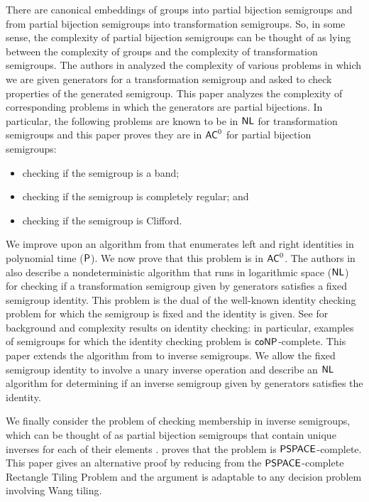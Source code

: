 \documentclass{amsart}
\newcommand{\NL}{\ensuremath\mathsf{NL}}
\newcommand{\NP}{\ensuremath\mathsf{NP}}
\newcommand{\co}{\ensuremath\mathsf{co}}
\newcommand{\PSPACE}{\ensuremath\mathsf{PSPACE}}
\newcommand{\AC}{\ensuremath\mathsf{AC}}
\newcommand{\Poly}{\ensuremath\mathsf{P}}
\theoremstyle{remark}
\numberwithin{equation}{section}
\begin{document}
There are canonical embeddings of groups into partial bijection semigroups and from partial bijection semigroups into transformation semigroups. So, in some sense, the complexity of partial bijection semigroups can be thought of as lying between the complexity of groups and the complexity of transformation semigroups. The authors in \cite{FJ:CP} analyzed the complexity of various problems in which we are given generators for a transformation semigroup and asked to check properties of the generated semigroup. This paper analyzes the complexity of corresponding problems in which the generators are partial bijections. In particular, the following problems are known to be in $\NL$ for transformation semigroups and this paper proves they are in $\AC^0$ for partial bijection semigroups:

\begin{itemize}
\item checking if the semigroup is a band;
\item checking if the semigroup is completely regular; and
\item checking if the semigroup is Clifford.
\end{itemize}

We improve upon an algorithm from \cite{FJ:CP} that enumerates left and right identities in polynomial time ($\Poly$). We now prove that this problem is in $\AC^0$. The authors in \cite{FJ:CP} also describe a nondeterministic algorithm that runs in logarithmic space ($\NL$) for checking if a transformation semigroup given by generators satisfies a fixed semigroup identity. This problem is the dual of the well-known identity checking problem for which the semigroup is fixed and the identity is given. See \cite{AVG:CIC} for background and complexity results on identity checking: in particular, examples of semigroups for which the identity checking problem is $\co\NP$-complete. This paper extends the algorithm from \cite{FJ:CP} to inverse semigroups. We allow the fixed semigroup identity to involve a unary inverse operation and describe an $\NL$ algorithm for determining if an inverse semigroup given by generators satisfies the identity.

We finally  consider the problem of checking membership in inverse semigroups, which can be thought of as partial bijection semigroups that contain unique inverses for each of their elements \cite[Thm 5.1.7]{HO:FST}. \cite[Thm 4.10]{TJ:CI} proves that the problem is $\PSPACE$-complete. This paper gives an alternative proof by reducing from the $\PSPACE$-complete Rectangle Tiling Problem and the argument is adaptable to any decision problem involving Wang tiling.
\end{document}
